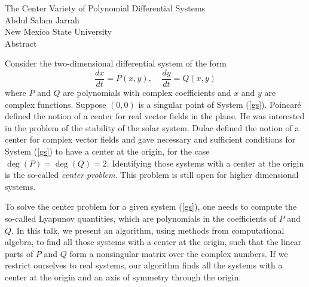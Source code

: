 \documentclass[11pt]{article}
\begin{document}

\begin{center}
{\Large  The Center Variety of Polynomial Differential Systems} \\
\medskip
Abdul Salam Jarrah \\
New Mexico State University\\
\vspace{1.0cm}
{\Large Abstract}
\end{center}

\bigskip
Consider the two-dimensional differential system of the form
\begin{equation}\label{gs}
\frac{dx}{dt} = P(x,y), \;\;\;\;
\frac{dy}{dt} = Q(x,y) 
\end{equation} 
where $P$ and $Q$ are polynomials with complex coefficients and $x$ 
and $y$ are complex functions. Suppose $(0,0)$ is a singular point
of System (\ref{gs}). Poincar\'e
defined the notion of a center for real vector fields in 
the plane. He was interested in the problem of the stability
of the solar system. Dulac defined the notion of a center for
complex vector fields and gave necessary and sufficient
conditions for System (\ref{gs}) to have a center at the origin, 
for the case $\deg(P) = \deg(Q) =2$. 
Identifying those systems with a center 
at the origin is the so-called {\it center problem}. This problem
is still open for higher dimensional systems.

To solve the center problem for a given system (\ref{gs}),
one needs to compute the so-called Lyapunov quantities, which are
polynomials in the coefficients of $P$ and $Q$. In this talk,
we present an algorithm, using methods from computational algebra,
to find all those systems with a center at the origin, such that the linear
parts of $P$ and $Q$ form a nonsingular matrix over the complex numbers.
If we restrict ourselves to real systems, our algorithm finds all the 
systems with a center at the origin and an axis of symmetry through the origin. 


\end{document}
